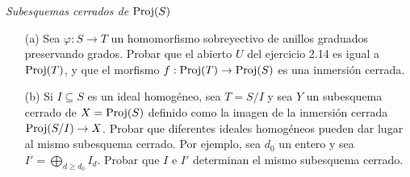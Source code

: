 \documentclass[twoside]{article}
\begin{document}
%
\newpage
%
\begin{ejercicio}{3.12}\emph{Subesquemas cerrados de $\operatorname{Proj}(S)$}
\begin{enumerate}
\item[(a)]Sea $\varphi:S\to T$ un homomorfismo sobreyectivo de anillos graduados preservando grados. Probar que el abierto $U$ del ejercicio 2.14 es igual a $\operatorname{Proj}(T)$, y que el morfismo $f:\operatorname{Proj}(T)\to\operatorname{Proj}(S)$ es una inmersión cerrada.
\item[(b)] Si $I\subseteq S$ es un ideal homogéneo, sea $T=S/I$ y sea $Y$ un subesquema cerrado de $X=\operatorname{Proj}(S)$ definido como la imagen de la inmersión cerrada $\operatorname{Proj}(S/I)\to X$. Probar que diferentes ideales homogéneos pueden dar lugar al mismo subesquema cerrado. Por ejemplo, sea $d_0$ un entero y sea $I'=\bigoplus_{d\geq d_0}I_d$. Probar que $I$ e $I'$ determinan el mismo subesquema cerrado.
\end{enumerate}
\end{ejercicio}
\end{document}
